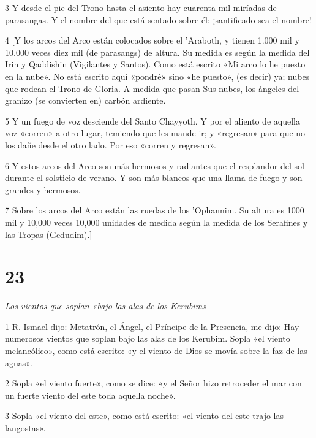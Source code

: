 \par 3 Y desde el pie del Trono hasta el asiento hay cuarenta mil miríadas de parasangas. Y el nombre del que está sentado sobre él: ¡santificado sea el nombre!

\par 4 [Y los arcos del Arco están colocados sobre el 'Araboth, y tienen 1.000 mil y 10.000 veces diez mil (de parasangs) de altura. Su medida es según la medida del Irin y Qaddishin (Vigilantes y Santos). Como está escrito «Mi arco lo he puesto en la nube». No está escrito aquí «pondré» sino «he puesto», (es decir) ya; nubes que rodean el Trono de Gloria. A medida que pasan Sus nubes, los ángeles del granizo (se convierten en) carbón ardiente.

\par 5 Y un fuego de voz desciende del Santo Chayyoth. Y por el aliento de aquella voz «corren» a otro lugar, temiendo que les mande ir; y «regresan» para que no los dañe desde el otro lado. Por eso «corren y regresan».

\par 6 Y estos arcos del Arco son más hermosos y radiantes que el resplandor del sol durante el solsticio de verano. Y son más blancos que una llama de fuego y son grandes y hermosos.

\par 7 Sobre los arcos del Arco están las ruedas de los 'Ophannim. Su altura es 1000 mil y 10,000 veces 10,000 unidades de medida según la medida de los Serafines y las Tropas (Gedudim).]

\chapter{23}

\par \textit{Los vientos que soplan «bajo las alas de los Kerubim»}

\par 1 R. Ismael dijo: Metatrón, el Ángel, el Príncipe de la Presencia, me dijo: Hay numerosos vientos que soplan bajo las alas de los Kerubim. Sopla «el viento melancólico», como está escrito: «y el viento de Dios se movía sobre la faz de las aguas».

\par 2 Sopla «el viento fuerte», como se dice: «y el Señor hizo retroceder el mar con un fuerte viento del este toda aquella noche».

\par 3 Sopla «el viento del este», como está escrito: «el viento del este trajo las langostas».

